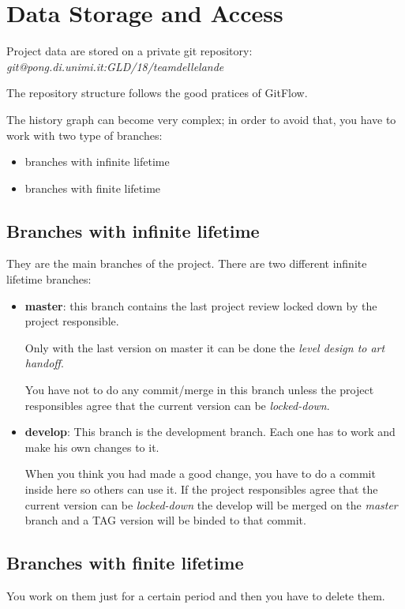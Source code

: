 \documentclass[12pt]{article}
\begin{document}
\section{Data Storage and Access}
Project data are stored on a private git repository:\\
	\textit{git@pong.di.unimi.it:GLD/18/teamdellelande}

The repository structure follows the good pratices of GitFlow.

The history graph can become very complex; in order to avoid that, you have to work with two type of branches:
\begin{itemize}
	\item branches with infinite lifetime
	\item branches with finite lifetime
\end{itemize}

\subsection{Branches with infinite lifetime}
They are the main branches of the project. There are two different infinite lifetime branches:
\begin{itemize}
\item \textbf{master}: this branch contains the last project review locked down by the project responsible.

  Only with the last version on master it can be done the \textit{level design to art handoff}.

  You have not to do any commit/merge in this branch unless the project responsibles agree that the current version can be \textit{locked-down}.

\item \textbf{develop}: This branch is the development branch. Each one has to work and make his own changes to it.

  When you think you had made a good change, you have to do a commit inside here so others can use it.
  If the project responsibles agree that the current version can be \textit{locked-down} the develop will be merged on the \textit{master} branch and a TAG version will be binded to that commit.
\end{itemize}

\subsection{Branches with finite lifetime}
You work on them just for a certain period and then you have to delete them.
\end{document}
